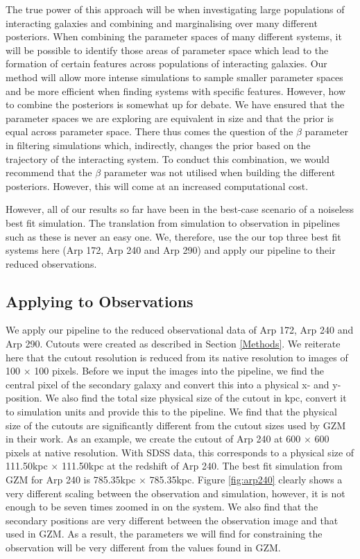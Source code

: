 The true power of this approach will be when investigating large populations of interacting galaxies and combining and marginalising over many different posteriors. When combining the parameter spaces of many different systems, it will be possible to identify those areas of parameter space which lead to the formation of certain features across populations of interacting galaxies. Our method will allow more intense simulations to sample smaller parameter spaces and be more efficient when finding systems with specific features. However, how to combine the posteriors is somewhat up for debate. We have ensured that the parameter spaces we are exploring are equivalent in size and that the prior is equal across parameter space. There thus comes the question of the $\beta$ parameter in filtering simulations which, indirectly, changes the prior based on the trajectory of the interacting system. To conduct this combination, we would recommend that the $\beta$ parameter was not utilised when building the different posteriors. However, this will come at an increased computational cost. 

However, all of our results so far have been in the best-case scenario of a noiseless best fit simulation. The translation from simulation to observation in pipelines such as these is never an easy one. We, therefore, use the our top three best fit systems here (Arp 172, Arp 240 and Arp 290) and apply our pipeline to their reduced observations.

\subsection{Applying to Observations}
\noindent We apply our pipeline to the reduced observational data of Arp 172, Arp 240 and Arp 290. Cutouts were created as described in Section \ref{Methods}. We reiterate here that the cutout resolution is reduced from its native resolution to images of 100 $\times$ 100 pixels. Before we input the images into the pipeline, we find the central pixel of the secondary galaxy and convert this into a physical x- and y-position. We also find the total size physical size of the cutout in kpc, convert it to simulation units and provide this to the pipeline. We find that the physical size of the cutouts are significantly different from the cutout sizes used by GZM in their work. As an example, we create the cutout of Arp 240 at 600 $\times$ 600 pixels at native resolution. With SDSS data, this corresponds to a physical size of 111.50kpc $\times$ 111.50kpc at the redshift of Arp 240. The best fit simulation from GZM for Arp 240 is 785.35kpc $\times$ 785.35kpc. Figure \ref{fig:arp240} clearly shows a very different scaling between the observation and simulation, however, it is not enough to be seven times zoomed in on the system. We also find that the secondary positions are very different between the observation image and that used in GZM. As a result, the parameters we will find for constraining the observation will be very different from the values found in GZM. 

